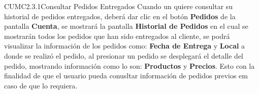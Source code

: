 
\begin{UseCase}{CUMC2.3.1}{Consultar Pedidos Entregados}{
Cuando un  quiere consultar su historial de pedidos entregados, deberá dar clic en el botón \textbf{Pedidos} de la pantalla %
\textbf{Cuenta}, se mostrará la pantalla %
\textbf{Historial de Pedidos} en el cual se mostrarán todos los pedidos que han sido entregados al cliente, se podrá visualizar la información de los pedidos como: \textbf{Fecha de Entrega} y \textbf{Local} a donde se realizó el pedido, al presionar un pedido se desplegará el detalle del pedido, mostrando información como lo son: \textbf{Productos} y \textbf{Precios}. Esto con la finalidad de que el usuario pueda conusltar información de pedidos previos em caso de que lo requiera.}

%			
\end{UseCase}
		
